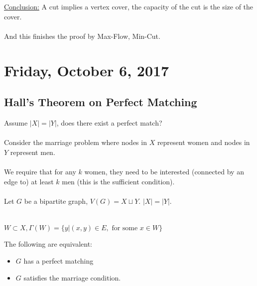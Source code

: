 \documentclass[12pt]{article}
\begin{document}
\underline{Conclusion:} A cut implies a vertex cover, the capacity of the cut is the size of the cover.\\
\\
And this finishes the proof by Max-Flow, Min-Cut.

\newpage

\section{Friday, October 6, 2017}

\subsection{Hall's Theorem on Perfect Matching}

Assume $|X| = |Y|$, does there exist a perfect match?\\
\\
Consider the marriage problem where nodes in $X$ represent women and nodes in $Y$ represent men.\\
\\
We require that for any $k$ women, they need to be interested (connected by an edge to) at least $k$ men (this is the sufficient condition).\\
\\
Let $G$ be a bipartite graph, $V(G) = X \sqcup Y$. $|X|=|Y|$.\\
\\
\begin{tcolorbox}[title=Marriage Condition]
	$W\subset X, \Gamma (W) = \{ y | (x,y)\in E, \text{ for some } x\in W \}$
\end{tcolorbox}
\begin{tcolorbox}[title=Theorem]
	The following are equivalent:
	\begin{itemize}
		\item{$G$ has a perfect matching}
		\item{$G$ satisfies the marriage condition.}
	\end{itemize}
\end{tcolorbox}
\end{document}
